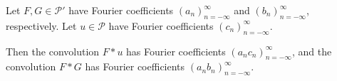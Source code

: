 Let $F, G \in \mathcal{P}'$ have Fourier coefficients $(a_n)_{n=-\infty}^{\infty}$ and $(b_n)_{n=-\infty}^{\infty}$, respectively.
Let $u \in \mathcal{P}$ have Fourier coefficients $(c_n)_{n=-\infty}^{\infty}$.

Then the convolution $F * u$ has Fourier coefficients $(a_n c_n)_{n=-\infty}^{\infty}$,
and the convolution $F * G$ has Fourier coefficients $(a_n b_n)_{n=-\infty}^{\infty}$.
